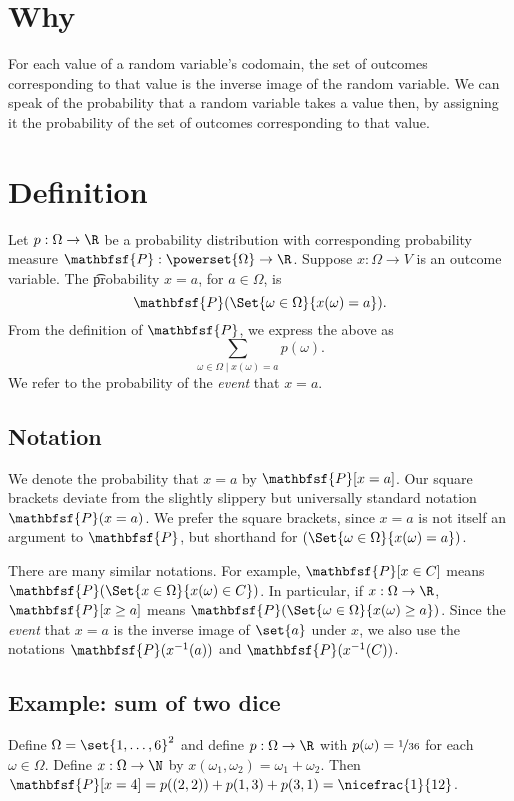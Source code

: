 
\section*{Why}

For each value of a random variable's codomain, the set of outcomes corresponding to that value is the inverse image of the random variable.
We can speak of the probability that a random variable takes a value then, by assigning it the probability of the set of outcomes corresponding to that value.

\section*{Definition}

Let $p: \Omega  \to \R $ be a probability distribution with corresponding probability measure $\mathbfsf{P} : \powerset{\Omega } \to \R $.
Suppose $x: \Omega  \to V$ is an outcome variable.
The \t{probability $x = a$}, for $a \in \Omega $, is
  \[
\textstyle
\mathbfsf{P} (\Set{\omega  \in \Omega }{x(\omega ) = a}).
  \]
From the definition of $\mathbfsf{P} $, we express the above as
  \[
\textstyle
\sum_{\omega  \in \Omega  \mid x(\omega ) = a} p(\omega ).
  \]
We refer to the probability of the \textit{event} that $x = a$.

\subsection*{Notation}

We denote the probability that $x = a$ by $\mathbfsf{P} [x =a]$.
Our square brackets deviate from the slightly slippery but universally standard notation $\mathbfsf{P} (x = a)$.
We prefer the square brackets, since $x=a$ is not itself an argument to $\mathbfsf{P} $, but shorthand for $(\Set{\omega  \in \Omega }{x(\omega ) = a})$.

There are many similar notations.
For example, $\mathbfsf{P} [x \in C]$ means $\mathbfsf{P} (\Set{x \in \Omega }{x(\omega ) \in C})$.
In particular, if $x: \Omega  \to \R $, $\mathbfsf{P} [x \geq a]$ means $\mathbfsf{P} (\Set{\omega  \in \Omega }{x(\omega ) \geq a})$.
Since the \textit{event} that $x = a$ is the inverse image of $\set{a}$ under $x$, we also use the notations $\mathbfsf{P} (x^{-1}(a))$ and $\mathbfsf{P} (x^{-1}(C))$.

\subsection*{Example: sum of two dice}

Define $\Omega  = \set{1, \dots , 6}^2$ and define $p: \Omega \to \R $ with $p(\omega ) = \nicefrac{1}{36}$ for each $\omega \in \Omega $.
Define $x: \Omega  \to \N $ by $x(\omega _1, \omega _2) = \omega _1 + \omega _2$.
Then $\mathbfsf{P} [x = 4] = p((2, 2)) + p(1, 3) + p(3, 1) = \nicefrac{1}{12}$.

